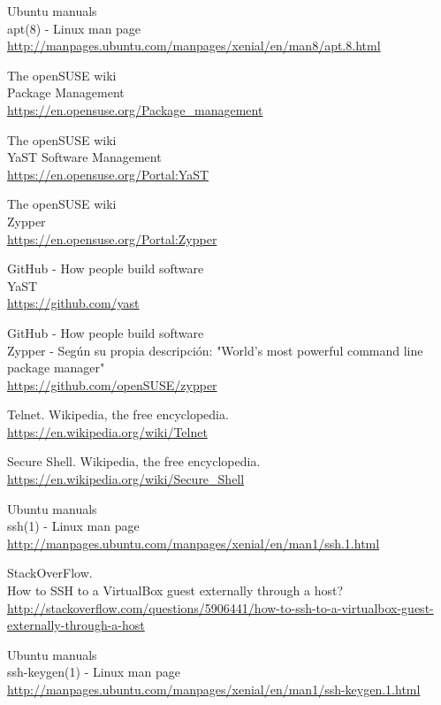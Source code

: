 \begin{thebibliography}{10}
Ubuntu manuals\\
apt(8) - Linux man page\\
  \url{http://manpages.ubuntu.com/manpages/xenial/en/man8/apt.8.html}

The openSUSE wiki\\
Package Management\\
  \url{https://en.opensuse.org/Package_management}

The openSUSE wiki\\
YaST Software Management\\
  \url{https://en.opensuse.org/Portal:YaST}

The openSUSE wiki\\
Zypper\\
  \url{https://en.opensuse.org/Portal:Zypper}

GitHub - How people build software\\
YaST\\
  \url{https://github.com/yast}

GitHub - How people build software\\
Zypper - Según su propia descripción: "World's most powerful command line package manager"\\
  \url{https://github.com/openSUSE/zypper}

Telnet. Wikipedia, the free encyclopedia.\\
  \url{https://en.wikipedia.org/wiki/Telnet}

Secure Shell. Wikipedia, the free encyclopedia.\\
  \url{https://en.wikipedia.org/wiki/Secure_Shell}

Ubuntu manuals\\
ssh(1) - Linux man page\\
  \url{http://manpages.ubuntu.com/manpages/xenial/en/man1/ssh.1.html}

StackOverFlow. \\
How to SSH to a VirtualBox guest externally through a host? \\
  \url{http://stackoverflow.com/questions/5906441/how-to-ssh-to-a-virtualbox-guest-externally-through-a-host}

Ubuntu manuals\\
ssh-keygen(1) - Linux man page\\
  \url{http://manpages.ubuntu.com/manpages/xenial/en/man1/ssh-keygen.1.html}


\end{thebibliography}
